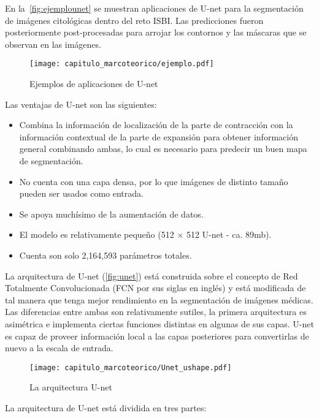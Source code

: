 En la~\autoref{fig:ejemplounet} se muestran aplicaciones de U-net para la
segmentación de imágenes citológicas dentro del reto ISBI. Las predicciones
fueron posteriormente post-procesadas para arrojar los contornos y las máscaras
que se observan en las imágenes.

\begin{figure}[H]
    \centering
    \texttt{[image: capitulo\_marcoteorico/ejemplo.pdf]}
    \caption{Ejemplos de aplicaciones de U-net}\label{fig:ejemplounet}
\end{figure}

Las ventajas de U-net son las siguientes:

\begin{itemize}
    \item Combina la información de localización de la parte de contracción con la
    información contextual de la parte de expansión para obtener información
    general combinando ambas, lo cual es necesario para predecir un buen mapa
    de segmentación.
    \item No cuenta con una capa densa, por lo que imágenes de distinto tamaño pueden
    ser usados como entrada.
    \item Se apoya muchísimo de la aumentación de datos.
    \item El modelo es relativamente pequeño (512 $\times$ 512 U-net - ca. 89mb).
    \item Cuenta son solo 2,164,593 parámetros totales.
\end{itemize}

La arquitectura de U-net (\autoref{fig:unet}) está construida sobre el concepto de 
Red Totalmente Convolucionada (FCN por sus siglas en inglés) y está modificada
de tal manera que tenga mejor rendimiento en la segmentación de imágenes médicas. 
Las diferencias entre ambas son relativamente sutiles, la primera arquitectura es
asimétrica e implementa ciertas funciones distintas en algunas de sus capas. U-net
es capaz de proveer información local a las capas posteriores para convertirlas
de nuevo a la escala de entrada.~\cite{DeepLearning}

\begin{figure}[H]
    \centering
    \texttt{[image: capitulo\_marcoteorico/Unet\_ushape.pdf]}
    \caption{La arquitectura U-net}\label{fig:unet}
\end{figure}

La arquitectura de U-net está dividida en tres partes:

